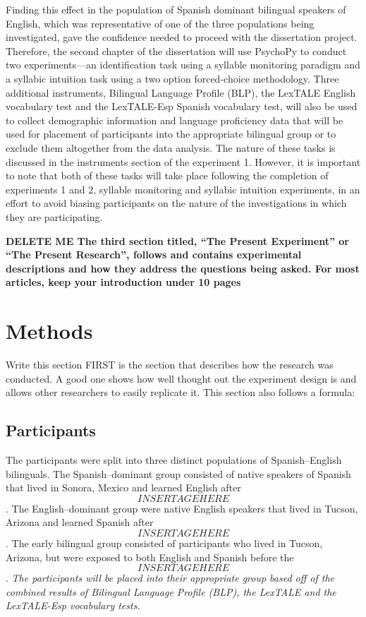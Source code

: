 Finding this effect in the population of Spanish dominant bilingual speakers of English, which was representative of one of the three populations being investigated, gave the confidence needed to proceed with the dissertation project. Therefore, the second chapter of the dissertation will use PsychoPy to conduct two experiments—an identification task using a syllable monitoring paradigm and a syllabic intuition task using a two option forced-choice methodology. Three additional instruments, Bilingual Language Profile (BLP), the LexTALE English vocabulary test and the LexTALE-Esp Spanish vocabulary test, will also be used to collect demographic information and language proficiency data that will be used for placement of participants into the appropriate bilingual group or to exclude them altogether from the data analysis. The nature of these tasks is discussed in the instruments section of the experiment 1. However, it is important to note that both of these tasks will take place following the completion of experiments 1 and 2, syllable monitoring and syllabic intuition experiments, in an effort to avoid biasing participants on the nature of the investigations in which they are participating.


\textbf{DELETE ME The third section titled, “The Present Experiment” or “The Present Research”, follows and contains experimental descriptions and how they address the questions being asked.
For most articles, keep your introduction under 10 pages}


\section{Methods}

Write this section FIRST
is the section that describes how the research was conducted. A good one shows how well thought out the experiment design is and allows other researchers to easily replicate it. This section also follows a formula:

\subsection{Participants}

The participants were split into three distinct populations of Spanish–English bilinguals. The Spanish–dominant group consisted of native speakers of Spanish that lived in Sonora, Mexico and learned English after \[INSERT AGE HERE\]. The English–dominant group were native English speakers that lived in Tucson, Arizona and learned Spanish after \[INSERT AGE HERE\]. The early bilingual group consisted of participants who lived in Tucson, Arizona, but were exposed to both English and Spanish before the \[INSERT AGE HERE\].
\emph{The participants will be placed into their appropriate group based off of the combined results of Bilingual Language Profile (BLP), the LexTALE and the LexTALE-Esp vocabulary tests.} 

